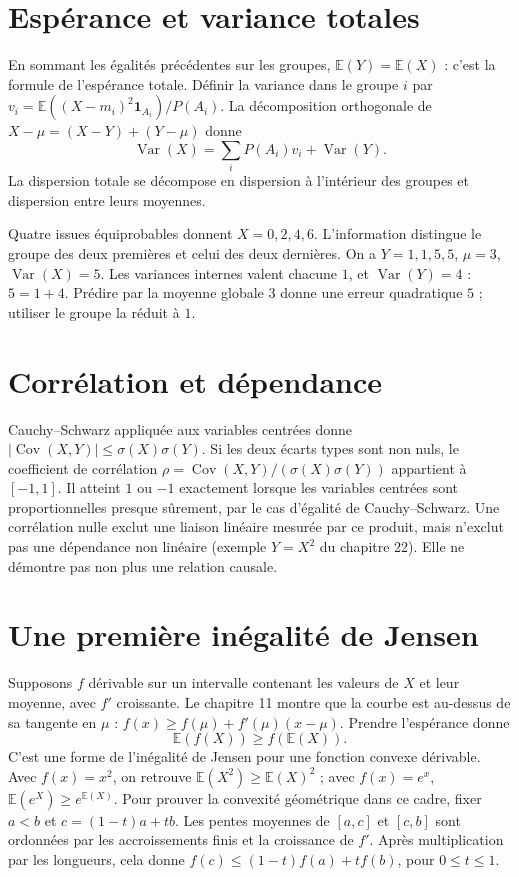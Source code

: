 \documentclass[../cours_1re.tex]{subfiles}
\begin{document}
\section{Espérance et variance totales}
En sommant les égalités précédentes sur les groupes,
$\mathbb E(Y)=\mathbb E(X)$ : c'est la formule de l'espérance totale.
Définir la variance dans le groupe $i$ par
$v_i=\mathbb E((X-m_i)^2\mathbf1_{A_i})/P(A_i)$.
La décomposition orthogonale de $X-\mu=(X-Y)+(Y-\mu)$ donne
\[
\operatorname{Var}(X)=\sum_iP(A_i)v_i+\operatorname{Var}(Y).
\]
La dispersion totale se décompose en dispersion à l'intérieur des groupes
et dispersion entre leurs moyennes.

\begin{exemple}
Quatre issues équiprobables donnent $X=0,2,4,6$.
L'information distingue le groupe des deux premières et celui des deux dernières.
On a $Y=1,1,5,5$, $\mu=3$, $\operatorname{Var}(X)=5$.
Les variances internes valent chacune $1$, et $\operatorname{Var}(Y)=4$ :
$5=1+4$. Prédire par la moyenne globale $3$ donne une erreur quadratique $5$ ;
utiliser le groupe la réduit à $1$.
\end{exemple}

\section{Corrélation et dépendance}
Cauchy--Schwarz appliquée aux variables centrées donne
$|\operatorname{Cov}(X,Y)|\le\sigma(X)\sigma(Y)$.
Si les deux écarts types sont non nuls, le coefficient de corrélation
$\rho=\operatorname{Cov}(X,Y)/(\sigma(X)\sigma(Y))$ appartient à $[-1,1]$.
Il atteint $1$ ou $-1$ exactement lorsque les variables centrées sont
proportionnelles presque sûrement, par le cas d'égalité de Cauchy--Schwarz.
Une corrélation nulle exclut une liaison linéaire mesurée par ce produit,
mais n'exclut pas une dépendance non linéaire (exemple $Y=X^2$ du chapitre 22).
Elle ne démontre pas non plus une relation causale.

\section{Une première inégalité de Jensen}
Supposons $f$ dérivable sur un intervalle contenant les valeurs de $X$
et leur moyenne, avec $f'$ croissante. Le chapitre 11 montre que la courbe
est au-dessus de sa tangente en $\mu$ :
$f(x)\ge f(\mu)+f'(\mu)(x-\mu)$.
Prendre l'espérance donne
\[
\mathbb E(f(X))\ge f(\mathbb E(X)).
\]
C'est une forme de l'inégalité de Jensen pour une fonction convexe dérivable.
Avec $f(x)=x^2$, on retrouve $\mathbb E(X^2)\ge\mathbb E(X)^2$ ;
avec $f(x)=e^x$, $\mathbb E(e^X)\ge e^{\mathbb E(X)}$.
Pour prouver la convexité géométrique dans ce cadre, fixer $a<b$ et
$c=(1-t)a+tb$. Les pentes moyennes de $[a,c]$ et $[c,b]$ sont ordonnées
par les accroissements finis et la croissance de $f'$.
Après multiplication par les longueurs, cela donne
$f(c)\le(1-t)f(a)+tf(b)$, pour $0\le t\le1$.
\end{document}
